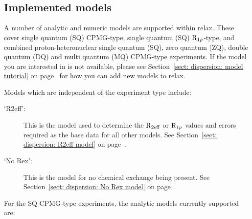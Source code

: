 
\subsection{Implemented models}
\label{sect: dispersion: implemented models}

A number of analytic and numeric models are supported within relax.
These cover single quantum (SQ) CPMG-type, single quantum (SQ) $\mathrm{R}_{1\rho}$-type, and combined proton-heteronuclear single quantum (SQ), zero quantum (ZQ), double quantum (DQ) and multi quantum (MQ) CPMG-type experiments. 
If the model you are interested in is not available, please see Section~\ref{sect: dispersion: model tutorial} on page~\pageref{sect: dispersion: model tutorial} for how you can add new models to relax.

Models which are independent of the experiment type include:

\begin{description}
\item[`R2eff':]  This is the model used to determine the $\mathrm{R}_\textrm{2eff}$ or $\mathrm{R}_{1\rho}$ values and errors required as the base data for all other models.  See Section~\ref{sect: dispersion: R2eff model} on page~\pageref{sect: dispersion: R2eff model}.
\item[`No Rex':]  This is the model for no chemical exchange being present.  See Section~\ref{sect: dispersion: No Rex model} on page~\pageref{sect: dispersion: No Rex model}.
\end{description}


For the SQ CPMG-type experiments, the analytic models currently supported are:

